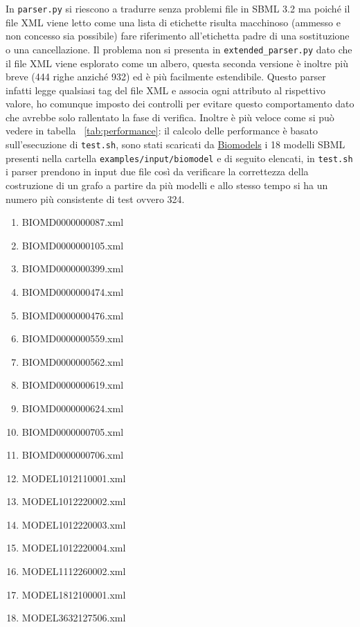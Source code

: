 \documentclass{article}
\begin{document}
In \texttt{parser.py} si riescono a tradurre senza problemi file in SBML 3.2 ma poiché il file XML viene letto come una lista di etichette risulta macchinoso (ammesso e non concesso sia possibile) fare riferimento all'etichetta padre di una sostituzione o una cancellazione. Il problema non si presenta in \texttt{extended\_parser.py} dato che il file XML viene esplorato come un albero, questa seconda versione è inoltre più breve (444 righe anziché 932) ed è più facilmente estendibile. Questo parser infatti legge qualsiasi tag del file XML e associa ogni attributo al rispettivo valore, ho comunque imposto dei controlli per evitare questo comportamento dato che avrebbe solo rallentato la fase di verifica. Inoltre è più veloce come si può vedere in tabella ~\ref{tab:performance}: il calcolo delle performance è basato sull'esecuzione di \texttt{test.sh}, sono stati scaricati da \href{https://www.ebi.ac.uk/biomodels/}{Biomodels} i 18 modelli SBML presenti nella cartella \texttt{examples/input/biomodel} e di seguito elencati, in \texttt{test.sh} i parser prendono in input due file così da verificare la correttezza della costruzione di un grafo a partire da più modelli e allo stesso tempo si ha un numero più consistente di test ovvero 324. 

\begin{multicols}{2}
    \begin{enumerate}
        \item BIOMD0000000087.xml
        \item BIOMD0000000105.xml
        \item BIOMD0000000399.xml
        \item BIOMD0000000474.xml
        \item BIOMD0000000476.xml
        \item BIOMD0000000559.xml
        \item BIOMD0000000562.xml
        \item BIOMD0000000619.xml
        \item BIOMD0000000624.xml
        \item BIOMD0000000705.xml
        \item BIOMD0000000706.xml
        \item MODEL1012110001.xml
        \item MODEL1012220002.xml
        \item MODEL1012220003.xml
        \item MODEL1012220004.xml
        \item MODEL1112260002.xml
        \item MODEL1812100001.xml
        \item MODEL3632127506.xml
    \end{enumerate}
\end{multicols}
\end{document}
